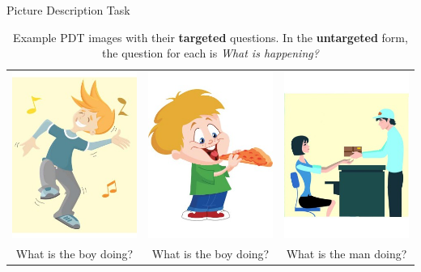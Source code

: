 \documentclass[final,t]{beamer}
\begin{document}
\begin{frame}{}
\begin{columns}[t]
\begin{column}{.33\linewidth}
\begin{block}{Picture Description Task}
\begin{center}
\begin{minipage}{.85\textwidth}
\begin{table}[htb!]
\begin{center}
\begin{tabular}{|c|c|c|}
{\includegraphics[width=0.29\columnwidth]{../figures/I01.jpg}} & {\includegraphics[width=0.3\columnwidth]{../figures/I02.jpg}} & {\includegraphics[width=0.3\columnwidth]{../figures/I03.jpg}} \\
What is the boy doing? & What is the boy doing? & What is the man doing? \\
\hline
\end{tabular}
\medskip
\caption{\label{tab:example-pdt-items} Example PDT images with their \textbf{targeted} questions. In the \textbf{untargeted} form, the question for each is \textit{What is happening?}} %
\end{center}
\end{table}
	

\end{minipage}
\end{center}
\end{block}
\end{column}
\end{columns}
\end{frame}
\end{document}
